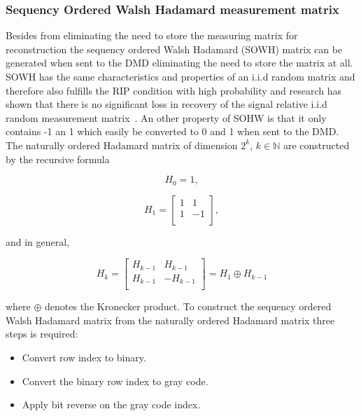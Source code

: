 \subsubsection{Sequency Ordered Walsh Hadamard measurement matrix}
\label{sec:SOWHMM}
Besides from eliminating the need to store the measuring matrix for reconstruction the sequency ordered Walsh Hadamard (SOWH) matrix can be generated when sent to the DMD eliminating the need to store the matrix at all. SOWH has the same characteristics and properties of an i.i.d random matrix and therefore also fulfills the RIP condition with high probability and research has shown that there is no significant loss in recovery of the signal relative i.i.d random measurement matrix~\cite{article:an_improved_WH_matrix}.  An other property of SOHW is that it only contains -1 an 1 which easily be converted to 0 and 1 when sent to the DMD. \\[0.1in]


The naturally ordered Hadamard matrix of dimension $2^k$, $k \in \mathbb{N}$ are constructed by the recursive formula    

\begin{equation}
    H_0 = 1,
\end{equation}

\begin{equation}
    H_1 = \begin{bmatrix}
       1 & 1 \\
       1 & -1\\
     \end{bmatrix},
\end{equation}

and in general,

\begin{equation}
        H_k = \begin{bmatrix}
       H_{k-1} & H_{k-1} \\
       H_{k-1} & -H_{k-1}\\
       \end{bmatrix} = H_1 \oplus H_{k-1}
\end{equation}

where $\oplus$ denotes the Kronecker product. To construct the sequency ordered Walsh Hadamard matrix from the naturally ordered Hadamard matrix three steps is required:

\begin{itemize}
    \item Convert row index to binary.
    \item Convert the binary row index to gray code.
    \item Apply bit reverse on the gray code index.
\end{itemize}

